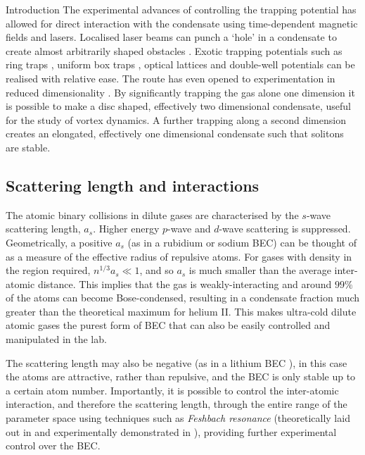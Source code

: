 \begin{chapter}{\label{cha:bose_gases}Introduction}
The experimental advances of controlling the trapping potential has allowed for direct interaction with the condensate using time-dependent magnetic fields and lasers. Localised laser beams can punch a `hole' in a condensate to create almost arbitrarily shaped obstacles \cite{Henderson09}. Exotic trapping potentials such as ring traps \cite{persistent,Ramanathan11}, uniform box traps \cite{gaunt_2013,chomaz_2015}, optical lattices \cite{Greiner02} and double-well \cite{PhysRevLett.106.025302} potentials can be realised with relative ease. The route has even opened to experimentation in reduced dimensionality \cite{Gorlitz,PhysRevLett.87.080403,PhysRevLett.91.250402,PhysRevLett.92.173003}. By significantly trapping the gas alone one dimension it is possible to make a disc shaped, effectively two dimensional condensate, useful \cite{Neely,Freilich2010} for the study of vortex dynamics. A further trapping along a second dimension creates an elongated, effectively one dimensional condensate such that solitons are stable.

\subsection{Scattering length and interactions}
The atomic binary collisions in dilute gases are characterised by the $s$-wave scattering length, $a_s$. Higher energy $p$-wave and $d$-wave scattering is suppressed. Geometrically, a positive $a_s$ (as in a rubidium or sodium BEC) can be thought of as a measure of the effective radius of repulsive atoms. For gases with density in the region required, $n^{1/3}a_s \ll 1$, and so $a_s$ is much smaller than the average inter-atomic distance. This implies that the gas is weakly-interacting and around $99\%$ of the atoms can become Bose-condensed, resulting in a condensate fraction much greater than the theoretical maximum for helium II. This makes ultra-cold dilute atomic gases the purest form of BEC that can also be easily controlled and manipulated in the lab.

The scattering length may also be negative (as in a lithium BEC \cite{PhysRevLett.75.1687, PhysRevLett.78.985}), in this case the atoms are attractive, rather than repulsive, and the BEC is only stable up to a certain atom number. Importantly, it is possible to control the inter-atomic interaction, and therefore the scattering length, through the entire range of the parameter space using techniques such as {\it Feshbach resonance} (theoretically laid out in \cite{weiner2003cold} and experimentally demonstrated in \cite{Inouye1998,PhysRevLett.82.2422,PhysRevLett.85.1795}), providing further experimental control over the BEC.


\end{chapter}
